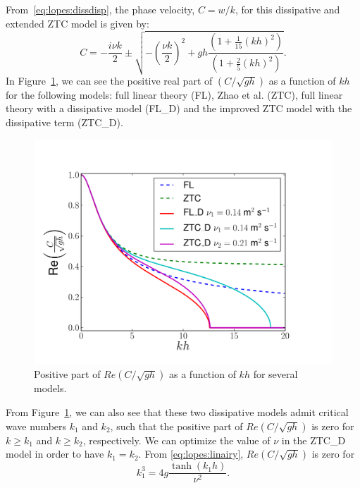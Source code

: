 From~\eqref{eq:lopes:dissdisp}, the phase velocity, $C= w/k$, for this
dissipative and extended ZTC model is given by:
\begin{equation}
\label{eq:lopes:phasevel}
C = -\frac{i\nu k}{2}\pm\sqrt{-\left(\frac{\nu
      k}{2}\right)^2+gh\frac{(1+\frac{1}{15}(kh)^2)}{(1+\frac{2}{5}(kh)^2)}}.
\end{equation}
In Figure~\ref{fig:lopes:dispersion}, we can see the positive real
part of $\displaystyle\left(C/\sqrt{gh}\right)$ as a function of $kh$
for the following models: full linear theory (FL), Zhao et al. (ZTC),
full linear theory with a dissipative model (FL\_D) and the improved
ZTC model with the dissipative term (ZTC\_D).
\begin{figure}
  \begin{center}
    \includegraphics[width=\largefig]{chapters/lopes/pdf/phase_velocity_simple.pdf}
  \end{center}
  \caption{Positive part of $\displaystyle
    Re\left(C/\sqrt{gh}\right)$ as a function of $kh$ for
    several models.}
  \label{fig:lopes:dispersion}
\end{figure}
From Figure~\ref{fig:lopes:dispersion}, we can also see that
these two dissipative models admit critical wave numbers $k_1$ and
$k_2$, such that the positive part of $\displaystyle
Re\left(C/\sqrt{gh}\right)$ is zero for $k\geqslant k_1$ and
$k\geqslant k_2$, respectively.  We can optimize the value of $\nu$ in
the ZTC\_D model in order to have $k_1=k_2$.  From
\eqref{eq:lopes:linairy}, $\displaystyle Re\left(C/\sqrt{gh}\right)$
is zero for
\begin{equation}
  k_1^3=4g\frac{\tanh{(k_1h)}}{\nu^2}.
\end{equation}
